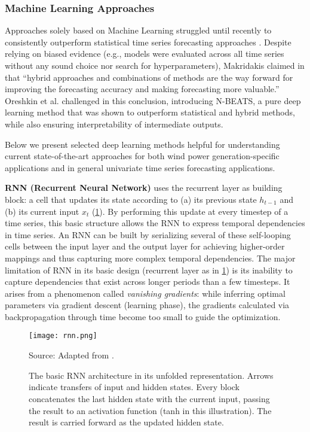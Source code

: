 \subsubsection{Machine Learning Approaches}\label{subsubsec:ml_methods}

Approaches solely based on Machine Learning struggled until recently to consistently outperform statistical time series forecasting approaches \cite{makridakis2018m4}.  Despite relying on biased evidence (e.g., models were evaluated across all time series without any sound choice nor search for hyperparameters), Makridakis claimed in \cite{makridakis2018m4} that ``hybrid approaches and combinations of methods are the way forward for improving the forecasting accuracy and making forecasting more valuable.'' Oreshkin et al. challenged in \cite{oreshkin2019nbeats} this conclusion, introducing N-BEATS, a pure deep learning method that was shown to outperform statistical and hybrid methods, while also ensuring interpretability of intermediate outputs.

Below we present selected deep learning methods helpful for understanding current state-of-the-art approaches for both wind power generation-specific applications and in general univariate time series forecasting applications.

\vspace{1em}
\noindent
\textbf{RNN (Recurrent Neural Network)} uses the recurrent layer as building block: a cell that updates its state according to (a) its previous state $h_{t-1}$ and (b) its current input $x_t$ (\ref{fig:rnn}). By performing this update at every timestep of a time series, this basic structure allows the RNN to express temporal dependencies in time series. An RNN can be built by serializing several of these self-looping cells between the input layer and the output layer for achieving higher-order mappings and thus capturing more complex temporal dependencies. The major limitation of RNN in its basic design (recurrent layer as in \ref{fig:rnn}) is its inability to capture dependencies that exist across longer periods than a few timesteps. It arises from a phenomenon called \textit{vanishing gradients}: while inferring optimal parameters via gradient descent (learning phase), the gradients calculated via backpropagation through time become too small to guide the optimization.
\begin{figure}[H]
	\centering
    \caption{The basic RNN architecture in its unfolded representation. Arrows indicate transfers of input and hidden states. Every block concatenates the last hidden state with the current input, passing the result to an activation function (tanh in this illustration). The result is carried forward as the updated hidden state.}
    \texttt{[image: rnn.png]}  \\
    \raggedright
    Source: Adapted from \cite{paneru2015lstm}.
	\label{fig:rnn}
\end{figure}

